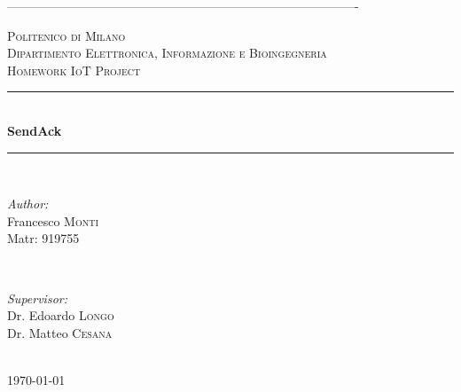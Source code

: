 \documentclass[12pt]{article}
\begin{document}
\begin{titlepage}

\newcommand{\HRule}{\rule{\linewidth}{0.5mm}} 

\center
-------------------------------------------------------------------------------------

\textsc{\LARGE Politenico di Milano}\\[1cm]
\textsc{\Large Dipartimento Elettronica, Informazione e Bioingegneria}\\[0.5cm] 
\textsc{\large Homework IoT Project}\\[0.5cm] 


\HRule \\[0.4cm]
{ \huge \bfseries SendAck}\\[0.4cm]
\HRule \\[1.5cm]
 

\begin{minipage}{0.4\textwidth}
	\begin{flushleft} \large
		\emph{Author:}\\
		Francesco \textsc{Monti}\\
		Matr: 919755 
	\end{flushleft}
\end{minipage}
~
\begin{minipage}{0.4\textwidth}
	\begin{flushright} \large
		\emph{Supervisor:} \\
		Dr. Edoardo \textsc{Longo}\\
		Dr. Matteo \textsc{Cesana}
	\end{flushright}
\end{minipage}\\[1.5cm]



{\large \today}\\[2cm] 


\end{titlepage}
\end{document}
